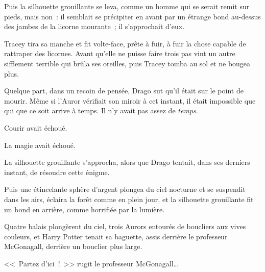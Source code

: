 Puis la silhouette grouillante se leva, comme un homme qui se serait remit sur pieds, mais non~: il semblait se précipiter en avant par un étrange bond au-dessus des jambes de la licorne mourante~; il s'approchait d'eux.

Tracey tira sa manche et fit volte-face, prête à fuir, à fuir la chose capable de rattraper des licornes. Avant qu'elle ne puisse faire trois pas vint un autre sifflement terrible qui brûla ses oreilles, puis Tracey tomba au sol et ne bougea plus.

Quelque part, dans un recoin de pensée, Drago sut qu'il était sur le point de mourir. Même si l'Auror vérifiait son miroir à cet instant, il était impossible que qui que ce soit arrive à temps. Il n'y avait pas assez de \emph{temps}.

Courir avait échoué.

La magie avait échoué.

La silhouette grouillante s'approcha, alors que Drago tentait, dans ses derniers instant, de résoudre cette énigme.

Puis une étincelante sphère d'argent plongea du ciel nocturne et se suspendit dans les airs, éclaira la forêt comme en plein jour, et la silhouette grouillante fit un bond en arrière, comme horrifiée par la lumière.

Quatre balais plongèrent du ciel, trois Aurors entourés de boucliers aux vives couleurs, et Harry Potter tenait sa baguette, assis derrière le professeur McGonagall, derrière un bouclier plus large.

<<~Partez d'ici~!~>> rugit le professeur McGonagall…

